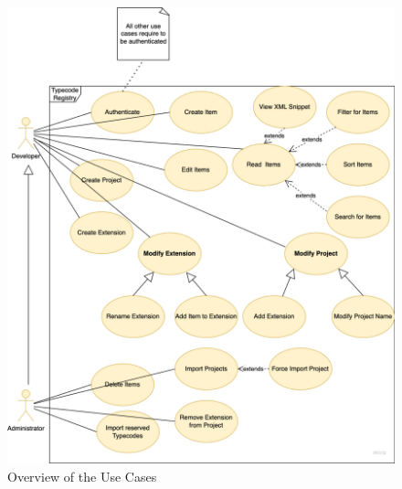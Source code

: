 \begin{figure}[H]
\hspace*{-0.5cm}\includegraphics[scale=0.21]{images/introduction/use_cases}
\caption{Overview of the Use Cases}
\label{fig:use-cases}
\end{figure}

